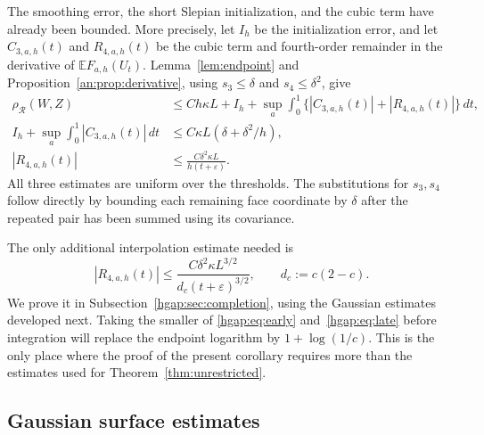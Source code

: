 \documentclass[11pt,letterpaper,twoside,leqno]{article}
\theoremstyle{bookplain}
\theoremstyle{bookremark}
\newcommand{\E}{\mathbb E}
\newcommand{\rh}{\rho_{\mathcal R}}
\newcommand{\dd}{\,d}
\begin{document}
The smoothing error, the short Slepian initialization, and the cubic
term have already been bounded. More precisely, let $I_h$ be the
initialization error, and let $C_{3,a,h}(t)$ and $R_{4,a,h}(t)$ be the
cubic term and fourth-order remainder in the derivative of
$\E F_{a,h}(U_t)$. Lemma~\ref{lem:endpoint} and
Proposition~\ref{an:prop:derivative}, using
$s_3\le\delta$ and $s_4\le\delta^2$, give
\begin{align}
 \rh(W,Z)&\le Ch\kappa L+I_h+
       \sup_a\int_0^1\{|C_{3,a,h}(t)|+|R_{4,a,h}(t)|\}\dd t,
                                             \label{hgap:eq:reduction}\\
 I_h+\sup_a\int_0^1|C_{3,a,h}(t)|\dd t
     &\le C\kappa L(\delta+\delta^2/h),        \label{hgap:eq:old-cubic}\\
 |R_{4,a,h}(t)|&\le\frac{C\delta^2\kappa L}{h(t+\varepsilon)}.
                                             \label{hgap:eq:early}
\end{align}
All three estimates are uniform over the thresholds. The substitutions
for $s_3,s_4$ follow directly by bounding each remaining face coordinate
by $\delta$ after the repeated pair has been summed using its covariance.

The only additional interpolation estimate needed is
\begin{equation}\label{hgap:eq:late}
 |R_{4,a,h}(t)|\le
 \frac{C\delta^2\kappa L^{3/2}}{d_c(t+\varepsilon)^{3/2}},
 \qquad d_c:=c(2-c).
\end{equation}
We prove it in Subsection~\ref{hgap:sec:completion}, using the Gaussian
estimates developed next. Taking the smaller of
\eqref{hgap:eq:early} and~\eqref{hgap:eq:late} before integration will
replace the endpoint logarithm by $1+\log(1/c)$. This is the only
place where the proof of the present corollary requires more than
the estimates used for Theorem~\ref{thm:unrestricted}.

\subsection{Gaussian surface estimates}\label{hgap:sec:surfaces}
\end{document}
